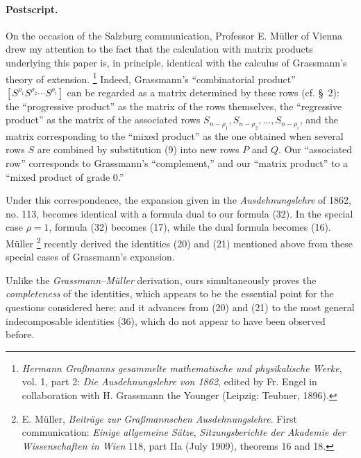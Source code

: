 \documentclass[11pt]{article}
\newcommand{\NoetherSrcNote}[2]{%
  \begingroup
  \renewcommand{\thefootnote}{\ensuremath{[\mathrm{#1}]}}%
  \footnote{#2}%
  \endgroup
}
\begin{document}
\paragraph{Postscript.} On the occasion of the Salzburg communication, Professor E. M\"uller of Vienna drew my attention to the fact that the calculation with matrix products underlying this paper is, in principle, identical with the calculus of Grassmann's theory of extension.\NoetherSrcNote{121:***}{\emph{Hermann Gra\ss manns gesammelte mathematische und physikalische Werke}, vol. 1, part 2: \emph{Die Ausdehnungslehre von 1862}, edited by Fr. Engel in collaboration with H. Grassmann the Younger (Leipzig: Teubner, 1896).} Indeed, Grassmann's ``combinatorial product'' $[S^{\rho_1}S^{\rho_2}\cdots S^{\rho_i}]$ can be regarded as a matrix determined by these rows (cf. \S\ 2): the ``progressive product'' as the matrix of the rows themselves, the ``regressive product'' as the matrix of the associated rows $S_{n-\rho_1},S_{n-\rho_2},\ldots,S_{n-\rho_i}$, and the matrix corresponding to the ``mixed product'' as the one obtained when several rows $S$ are combined by substitution (9) into new rows $P$ and $Q$. Our ``associated row'' corresponds to Grassmann's ``complement,'' and our ``matrix product'' to a ``mixed product of grade 0.''

Under this correspondence, the expansion given in the \emph{Ausdehnungslehre} of 1862, no. 113, becomes identical with a formula dual to our formula (32). In the special case $\rho=1$, formula (32) becomes (17), while the dual formula becomes (16). M\"uller\NoetherSrcNote{122:*}{E. M\"uller, \emph{Beitr\"age zur Gra\ss mannschen Ausdehnungslehre}. First communication: \emph{Einige allgemeine S\"atze}, \emph{Sitzungsberichte der Akademie der Wissenschaften in Wien} 118, part IIa (July 1909), theorems 16 and 18.} recently derived the identities (20) and (21) mentioned above from these special cases of Grassmann's expansion.

Unlike the \emph{Grassmann--M\"uller} derivation, ours simultaneously proves the \emph{completeness} of the identities, which appears to be the essential point for the questions considered here; and it advances from (20) and (21) to the most general indecomposable identities (36), which do not appear to have been observed before.
\end{document}
